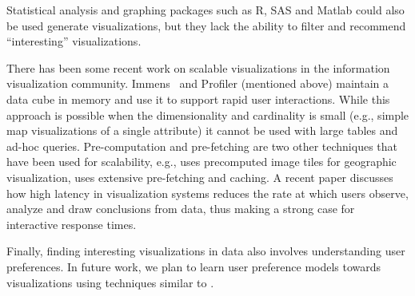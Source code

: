 Statistical analysis and graphing packages such as R, SAS and Matlab could also
be used generate visualizations, but they lack the ability to filter and
recommend ``interesting'' visualizations. 

There has been some recent work on
scalable visualizations in the information visualization community. Immens~\cite{2013-immens} and Profiler (mentioned above) maintain a data cube in memory and use it to support rapid user interactions. While this approach is possible when the dimensionality
and cardinality is small (e.g., simple map visualizations of a single
attribute) it cannot be used with large tables and ad-hoc queries.
Pre-computation and pre-fetching are two other techniques that have
been used for scalability, e.g., \cite{hotmap} uses
precomputed image tiles for geographic visualization,
\cite{doshi2003prefetching} uses extensive pre-fetching and caching. 
A recent paper \cite{2014-viz-latency} discusses how high
latency in visualization systems reduces the rate at which users observe,
analyze and draw conclusions from data, thus making a strong case for
interactive response times.

Finally, finding interesting visualizations in data also involves understanding
user preferences. 
In future work, we plan to learn user preference models towards visualizations
using techniques similar to \cite{CHI:YangLZ14, IUIGotzW09}. 



